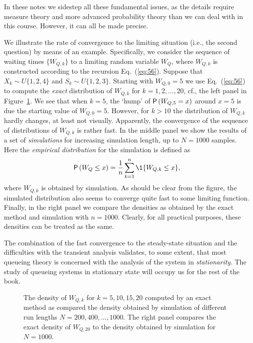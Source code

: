In these notes we sidestep all these fundamental issues, as the
details require measure theory and more advanced probability theory
than we can deal with in this course. However, it can all be made
precise. 

We illustrate the rate of convergence to the limiting situation (i.e., the second question) by means of an example. Specifically, we consider the sequence of waiting times $\{W_{Q,k}\}$ to a limiting random variable $W_Q$, where $W_{Q,k}$ is constructed according to the recursion
Eq.~(\ref{eq:56}). Suppose that $X_k\sim U\{1,2,4\}$ and
$S_k\sim U\{1,2,3\}$.  Starting with $W_{Q,0}=5$ we use
Eq.~(\ref{eq:56}) to compute the \emph{exact} distribution of
$W_{Q,k}$ for $k=1,2,\ldots, 20$, cf., the left panel in
Figure~\ref{fig:convergence}. We see that when $k=5$, the `hump' of
$\P{W_{Q,5}=x}$ around $x=5$ is due the starting value of
$W_{Q,0}=5$. However, for $k>10$ the distribution of $W_{Q,k}$ hardly
changes, at least not visually. Apparently, the convergence of the
sequence of distributions of $W_{Q,k}$ is rather fast. In the middle
panel we show the results of a set of \emph{simulations} for
increasing simulation length, up to $N=1000$ samples. Here the
\emph{empirical distribution} for the simulation is defined as
\begin{equation*}
\P{W_Q\leq x} =   \frac 1n \sum_{k=1}^n \1{W_{Q,k} \leq x},
\end{equation*}
where $W_{Q,k}$ is obtained by simulation. As should be clear from the
figure, the simulated distribution also seems to converge quite fast to
some limiting function. Finally, in the right panel we compare
the densities as obtained by the exact method and simulation with
$n=1000$. Clearly, for all practical purposes, these densities can be
treated as the same.

The combination of the fast convergence to the steady-state situation
and the difficulties with the transient analysis validates, to some
extent, that most queueing theory is concerned with the analysis of
the system in \emph{stationarity}. The study of queueing systems in
stationary state will occupy us for the rest of the book.

\begin{figure}
  \centering



  \caption{The density of $W_{Q,k}$ for $k=5, 10, 15, 20$ computed by
    an exact method as compared the density obtained by simulation of
    different run lengths $N=200, 400, \ldots, 1000$. The right panel
    compares the exact density of $W_{Q,20}$ to the density obtained by simulation
    for $N=1000$.}
\label{fig:convergence}
\end{figure}




